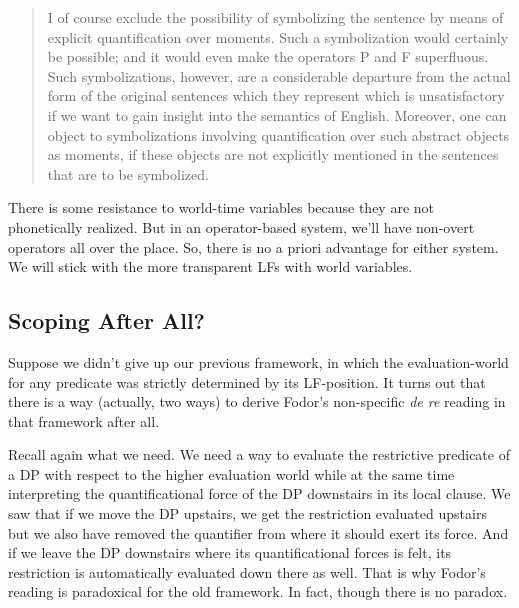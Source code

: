 \begin{quote}
  I of course exclude the possibility of symbolizing the sentence by means of explicit quantification over moments. Such a symbolization would certainly be possible; and it would even make the operators P and F superfluous. Such symbolizations, however, are a considerable departure from the actual form of the original sentences which they represent \dash which is unsatisfactory if we want to gain insight into the semantics of English. Moreover, one can object to symbolizations involving quantification over such abstract objects as moments, if these objects are not explicitly mentioned in the sentences that are to be symbolized. 
\end{quote}
%
There is some resistance to world-time variables because they are not phonetically realized. But in an operator-based system, we'll have non-overt operators all over the place. So, there is no a priori advantage for either system. We will stick with the more transparent LFs with world variables.

\subsection{Scoping After All?}

Suppose we didn't give up our previous framework, in which the evaluation-world for any predicate was strictly determined by its LF-position. It turns out that there is a way (actually, two ways) to derive Fodor's non-specific \emph{de re} reading in that framework after all.

Recall again what we need. We need a way to evaluate the restrictive predicate of a DP with respect to the higher evaluation world while at the same time interpreting the quantificational force of the DP downstairs in its local clause. We saw that if we move the DP upstairs, we get the restriction evaluated upstairs but we also have removed the quantifier from where it should exert its force. And if we leave the DP downstairs where its quantificational forces is felt, its restriction is automatically evaluated down there as well. That is why Fodor's reading is paradoxical for the old framework. In fact, though there is no paradox.

